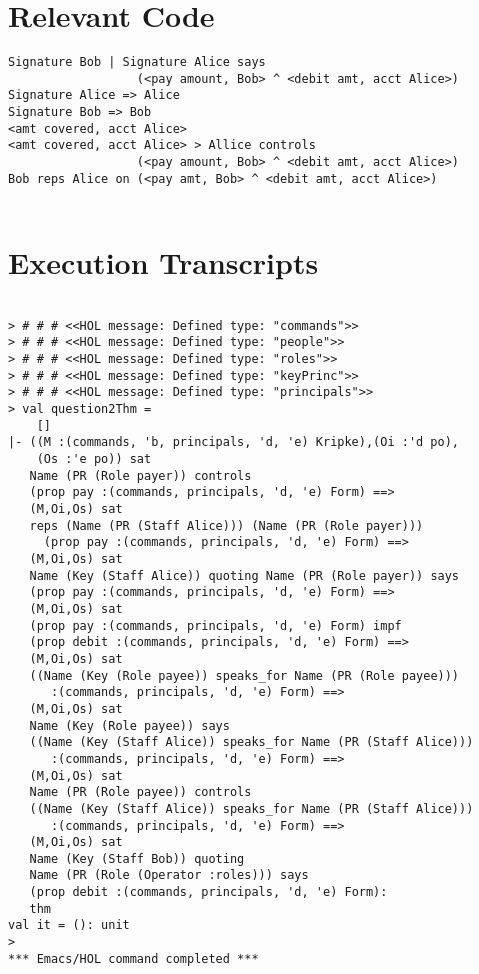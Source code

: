 \documentclass{report}
\begin{document}
\section{Relevant Code}
\label{sec:relevant-code-2}


\lstset{frameround=tttt}
\begin{lstlisting}[frame=tRBL]
Signature Bob | Signature Alice says  
                  (<pay amount, Bob> ^ <debit amt, acct Alice>)
Signature Alice => Alice
Signature Bob => Bob
<amt covered, acct Alice>
<amt covered, acct Alice> > Allice controls 
                  (<pay amount, Bob> ^ <debit amt, acct Alice>)
Bob reps Alice on (<pay amt, Bob> ^ <debit amt, acct Alice>)
   
\end{lstlisting}




\section{Execution Transcripts}
\label{sec:exec-transcr-2}

\setcounter{sessioncount}{0}
\begin{session}
  \begin{scriptsize}
\begin{verbatim}

> # # # <<HOL message: Defined type: "commands">>
> # # # <<HOL message: Defined type: "people">>
> # # # <<HOL message: Defined type: "roles">>
> # # # <<HOL message: Defined type: "keyPrinc">>
> # # # <<HOL message: Defined type: "principals">>
> val question2Thm =
    []
|- ((M :(commands, 'b, principals, 'd, 'e) Kripke),(Oi :'d po),
    (Os :'e po)) sat
   Name (PR (Role payer)) controls
   (prop pay :(commands, principals, 'd, 'e) Form) ==>
   (M,Oi,Os) sat
   reps (Name (PR (Staff Alice))) (Name (PR (Role payer)))
     (prop pay :(commands, principals, 'd, 'e) Form) ==>
   (M,Oi,Os) sat
   Name (Key (Staff Alice)) quoting Name (PR (Role payer)) says
   (prop pay :(commands, principals, 'd, 'e) Form) ==>
   (M,Oi,Os) sat
   (prop pay :(commands, principals, 'd, 'e) Form) impf
   (prop debit :(commands, principals, 'd, 'e) Form) ==>
   (M,Oi,Os) sat
   ((Name (Key (Role payee)) speaks_for Name (PR (Role payee)))
      :(commands, principals, 'd, 'e) Form) ==>
   (M,Oi,Os) sat
   Name (Key (Role payee)) says
   ((Name (Key (Staff Alice)) speaks_for Name (PR (Staff Alice)))
      :(commands, principals, 'd, 'e) Form) ==>
   (M,Oi,Os) sat
   Name (PR (Role payee)) controls
   ((Name (Key (Staff Alice)) speaks_for Name (PR (Staff Alice)))
      :(commands, principals, 'd, 'e) Form) ==>
   (M,Oi,Os) sat
   Name (Key (Staff Bob)) quoting
   Name (PR (Role (Operator :roles))) says
   (prop debit :(commands, principals, 'd, 'e) Form):
   thm
val it = (): unit
> 
*** Emacs/HOL command completed ***

\end{verbatim}
  \end{scriptsize}
\end{session}
\end{document}
